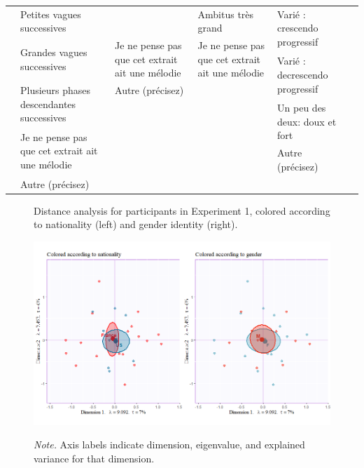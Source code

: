 \documentclass[
]{article}
\newenvironment{lltable}{\begin{landscape}\begin{center}\begin{ThreePartTable}}{\end{ThreePartTable}\end{center}\end{landscape}}
\begin{document}
\begin{lltable}
\begin{footnotesize}
\begin{longtable}{p{}p{}p{}p{}p{}p{}}
  & Petites vagues successives &  & Ambitus très grand & \multirow{2}{0.2\textwidth}{Varié : crescendo progressif} &\\
  & \multirow{2}{0.2\textwidth}{Grandes vagues successives} & \multirow{2}{0.2\textwidth}{Je ne pense pas que cet extrait ait une mélodie} & \multirow{2}{0.2\textwidth}{Je ne pense pas que cet extrait ait une mélodie} & &\\
  &   & & & \multirow{2}{0.2\textwidth}{Varié : decrescendo progressif}  & \\
  & \multirow{2}{0.2\textwidth}{Plusieurs phases descendantes successives} & Autre (précisez) & &  &\\
  & & & & \multirow{2}{0.2\textwidth}{Un peu des deux: doux et fort} & \\
  & \multirow{2}{0.2\textwidth}{Je ne pense pas que cet extrait ait une mélodie} & & &  & \\
  &  & & & Autre (précisez) & \\
  & Autre (précisez) & & &  & \\
  
\cmidrule[.75pt]{2-5}
\end{longtable}
\end{footnotesize}
\end{lltable}

\begin{figure}   
  \centering  
  \caption{Distance analysis for participants in Experiment 1, colored according to nationality (left) and gender identity (right).}
    \includegraphics{./supmatsimgs/qrvplot.png}
  \label{fig:qrvplot}
  \caption*{\footnotesize \textit{Note.} Axis labels indicate dimension, eigenvalue, and explained variance for that dimension.}
\end{figure}
\end{document}
